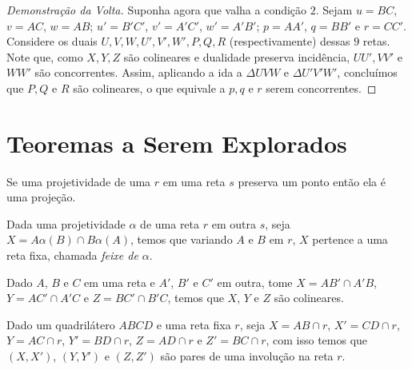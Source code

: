 \begin{proof}[Demonstração da Volta]
Suponha agora que valha a condição $2$.
Sejam \(u = BC\), \(v = AC\), \(w = AB\); \(u' = B'C'\), \(v' = A'C'\), \(w' = A'B'\); \(p = AA'\), \(q = BB'\) e \(r = CC'\). Considere os duais $U,V,W,U',V',W',P,Q,R$ (respectivamente) dessas $9$ retas. Note que, como $X,Y,Z$ são colineares e dualidade preserva incidência, $UU', VV'$ e $WW'$ são concorrentes. Assim, aplicando a ida a $\Delta UVW$ e $\Delta U'V'W'$, concluímos que $P,Q$ e $R$ são colineares, o que equivale a $p,q$ e $r$ serem concorrentes.
\end{proof}


\newpage
\section{Teoremas a Serem Explorados}
\begin{lem}
Se uma projetividade de uma $r$ em uma reta $s$ preserva um ponto então ela é uma projeção.
\end{lem}

\begin{thm}
Dada uma projetividade $\alpha$ de uma reta $r$ em outra $s$, seja $X = A\alpha(B) \cap B\alpha(A)$, temos que variando $A$ e $B$ em $r$, $X$ pertence a uma reta fixa, chamada \emph{feixe de $\alpha$}.
\end{thm}

\begin{cor}
Dado $A$, $B$ e $C$ em uma reta e $A'$, $B'$ e $C'$ em outra, tome $X = AB' \cap A'B$, $Y = AC'\cap A'C$ e $Z = BC' \cap B'C$, temos que $X$, $Y$ e $Z$ são colineares.
\end{cor}


\begin{thm}
Dado um quadrilátero $ABCD$ e uma reta fixa $r$, seja $X = AB \cap r$, $X' = CD \cap r$, $Y = AC \cap r$, $Y' = BD \cap r$, $Z = AD \cap r$ e $Z' = BC \cap r$, com isso temos que $(X,X')$, $(Y,Y')$ e $(Z,Z')$ são pares de uma involução na reta $r$.
    
\end{thm}